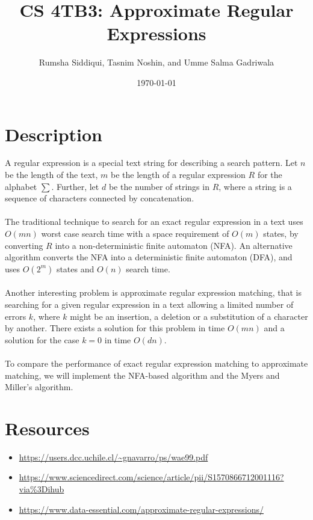 \documentclass[letterpaper,12pt]{article}
\begin{document}
\title{CS 4TB3: Approximate Regular Expressions}
\author{Rumsha Siddiqui, Tasnim Noshin, and Umme Salma Gadriwala}
\date{\today}
\maketitle



\section{Description}


A regular expression is a special text string for describing a search pattern. Let \(n\) be the length of the text, \(m\) be the length of a regular expression \(R\) for the alphabet \(\sum\). Further, let \(d\) be the number of strings in \(R\), where a string is a sequence of characters connected by concatenation.
\\\\
The traditional technique to search for an exact regular expression in a text uses \(O(mn)\) worst case search time with a space requirement of \(O(m)\) states, by converting \(R\) into a non-deterministic finite automaton (NFA). An alternative algorithm converts the NFA into a deterministic finite automaton (DFA), and uses \(O(2^m)\) states and \(O(n)\) search time.
\\\\
Another interesting problem is approximate regular expression matching, that is searching for a given regular expression in a text allowing a limited number of errors \(k\), where \(k\) might be an insertion, a deletion or a substitution of a character by another. There exists a solution for this problem in time \(O(mn)\) and a solution for the case \(k = 0\) in time \(O(dn)\).
\\\\
To compare the performance of exact regular expression matching to approximate matching, we will implement the NFA-based algorithm and the Myers and Miller's algorithm.

\section{Resources}
\begin{itemize}
\item \url{https://users.dcc.uchile.cl/~gnavarro/ps/wae99.pdf}
\item \url{https://www.sciencedirect.com/science/article/pii/S1570866712001116?via%3Dihub}
\item \url{https://www.data-essential.com/approximate-regular-expressions/}
\end{itemize}
\end{document}
